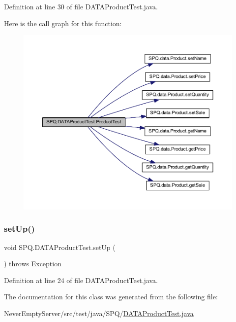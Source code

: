 Definition at line 30 of file D\+A\+T\+A\+Product\+Test.\+java.

Here is the call graph for this function\+:\nopagebreak
\begin{figure}[H]
\begin{center}
\leavevmode
\includegraphics[width=350pt]{class_s_p_q_1_1_d_a_t_a_product_test_afb49da7389a7f4f42159adf87b4a11be_cgraph}
\end{center}
\end{figure}
\mbox{\label{class_s_p_q_1_1_d_a_t_a_product_test_a64e9238fb4b99af0cdf55768230b4c89}} 
\subsubsection{\texorpdfstring{set\+Up()}{setUp()}}
{\footnotesize\ttfamily void S\+P\+Q.\+D\+A\+T\+A\+Product\+Test.\+set\+Up (\begin{DoxyParamCaption}{ }\end{DoxyParamCaption}) throws Exception}



Definition at line 24 of file D\+A\+T\+A\+Product\+Test.\+java.



The documentation for this class was generated from the following file\+:\begin{DoxyCompactItemize}
\item 
Never\+Empty\+Server/src/test/java/\+S\+P\+Q/\mbox{\hyperlink{_d_a_t_a_product_test_8java}{D\+A\+T\+A\+Product\+Test.\+java}}\end{DoxyCompactItemize}
